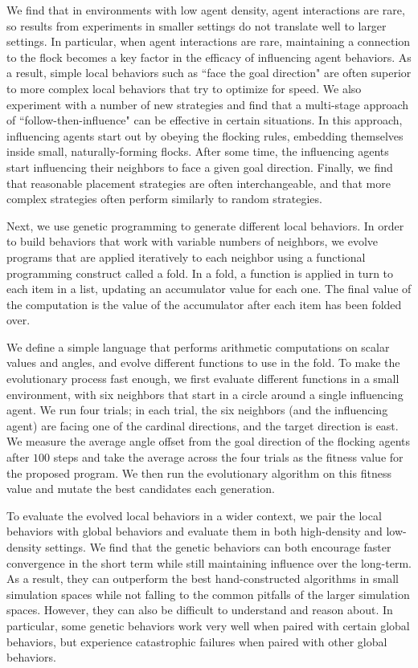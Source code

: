 We find that in environments with low agent density, agent interactions are rare,
so results from experiments in smaller settings do not translate well to larger
settings.
In particular, when agent interactions are rare, maintaining a connection to
the flock becomes a key factor in the efficacy of influencing agent behaviors.
As a result, simple local behaviors such as ``face the goal direction" are
often superior to more complex local behaviors that try to optimize for speed.
We also experiment with a number of new strategies and find that a multi-stage 
approach of ``follow-then-influence" can be effective in certain 
situations.
In this approach, influencing agents start out by obeying the flocking rules,
embedding themselves inside small, naturally-forming flocks.
After some time, the influencing agents start influencing their neighbors to
face a given goal direction.
Finally, we find that reasonable placement strategies are often 
interchangeable, and that more complex strategies often perform similarly to 
random strategies.

Next, we use genetic programming to generate different local behaviors.
In order to build behaviors that work with variable numbers of neighbors, we
evolve programs that are applied iteratively to each neighbor using
a functional programming construct called a fold.
In a fold, a function is applied in turn to each item in a list, updating an
accumulator value for each one.
The final value of the computation is the value of the accumulator after each
item has been folded over.

We define a simple language that performs arithmetic computations
on scalar values and angles, and evolve different functions to use in the fold.
To make the evolutionary process fast enough, we first evaluate different
functions in a small environment, with six neighbors that start in a circle
around a single influencing agent.
We run four trials; in each trial, the six neighbors (and the influencing agent)
are facing one of the cardinal directions, and the target direction is east.
We measure the average angle offset from the goal direction of the flocking
agents after $100$ steps and take the average across the four trials as the
fitness value for the proposed program.
We then run the evolutionary algorithm on this fitness value and mutate the
best candidates each generation.

To evaluate the evolved local behaviors in a wider context, we pair the local
behaviors with global behaviors and evaluate them in both high-density and
low-density settings.
We find that the genetic behaviors can both encourage faster convergence in the
short term while still maintaining influence over the long-term.
As a result, they can outperform the best hand-constructed algorithms in small
simulation spaces while not falling to the common pitfalls of the larger
simulation spaces.
However, they can also be difficult to understand and reason about.
In particular, some genetic behaviors work very well when paired with certain
global behaviors, but experience catastrophic failures when paired with other
global behaviors.

